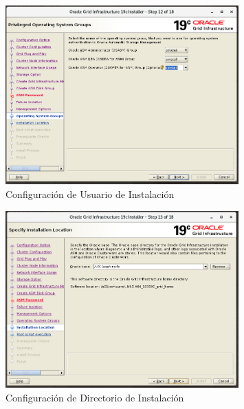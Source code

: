\documentclass{article}
\begin{document}
\begin{figure}[H]
		\begin{center}
			\includegraphics[width=0.80\textwidth]{grid_install_12_operating_system_groups.png}
		\end{center}
		\caption{Configuración de Usuario de Instalación}
\end{figure}

\begin{figure}[H]
		\begin{center}
			\includegraphics[width=0.80\textwidth]{grid_install_13_installation_location.png}
		\end{center}
		\caption{Configuración de Directorio de Instalación}
\end{figure}
\end{document}
